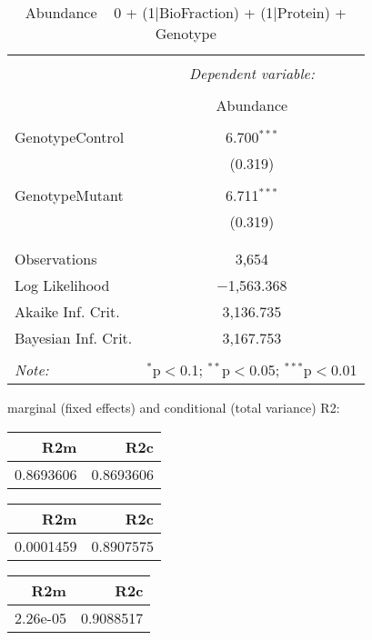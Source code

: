 \documentclass[11pt]{report}
\begin{document}
\begin{table}[!htbp] \centering 
  \caption{Abundance ~ 0 + (1|BioFraction) + (1|Protein) + Genotype} 
  \label{} 
\begin{tabular}{@{\extracolsep{5pt}}lc} 
\\[-1.8ex]\hline 
\hline \\[-1.8ex] 
 & \multicolumn{1}{c}{\textit{Dependent variable:}} \\ 
\cline{2-2} 
\\[-1.8ex] & Abundance \\ 
\hline \\[-1.8ex] 
 GenotypeControl & 6.700$^{***}$ \\ 
  & (0.319) \\ 
  & \\ 
 GenotypeMutant & 6.711$^{***}$ \\ 
  & (0.319) \\ 
  & \\ 
\hline \\[-1.8ex] 
Observations & 3,654 \\ 
Log Likelihood & $-$1,563.368 \\ 
Akaike Inf. Crit. & 3,136.735 \\ 
Bayesian Inf. Crit. & 3,167.753 \\ 
\hline 
\hline \\[-1.8ex] 
\textit{Note:}  & \multicolumn{1}{r}{$^{*}$p$<$0.1; $^{**}$p$<$0.05; $^{***}$p$<$0.01} \\ 
\end{tabular} 
\end{table} 
marginal (fixed effects) and conditional (total variance) R2:

\begin{tabular}{r|r}
\hline
R2m & R2c\\
\hline
0.8693606 & 0.8693606\\
\hline
\end{tabular}

\begin{tabular}{r|r}
\hline
R2m & R2c\\
\hline
0.0001459 & 0.8907575\\
\hline
\end{tabular}

\begin{tabular}{r|r}
\hline
R2m & R2c\\
\hline
2.26e-05 & 0.9088517\\
\hline
\end{tabular}
\end{document}
